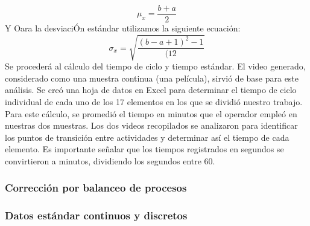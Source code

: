     
    \begin{equation}
        \mu_x=\dfrac{b+a}{2}
    \end{equation}
    Y Oara la desviaciÓn estándar utilizamos la siguiente ecuación:
    \begin{equation}
    \sigma_x=\sqrt{\dfrac{(b-a+1)^2-1}{(12}}
    \end{equation}
    Se procederá al cálculo del tiempo de ciclo y tiempo estándar. El video generado, considerado como una muestra continua (una película), sirvió de base para este análisis. Se creó una hoja de datos en Excel para determinar el tiempo de ciclo individual de cada uno de los 17 elementos en los que se dividió nuestro trabajo.
    Para este cálculo, se promedió el tiempo en minutos que el operador empleó en nuestras dos muestras. Los dos videos recopilados se analizaron para identificar los puntos de transición entre actividades y determinar así el tiempo de cada elemento. Es importante señalar que los tiempos registrados en segundos se convirtieron a minutos, dividiendo los segundos entre 60.
    
    \subsubsection{Corrección por balanceo de procesos}
    \subsubsection{Datos estándar continuos y discretos}
    
